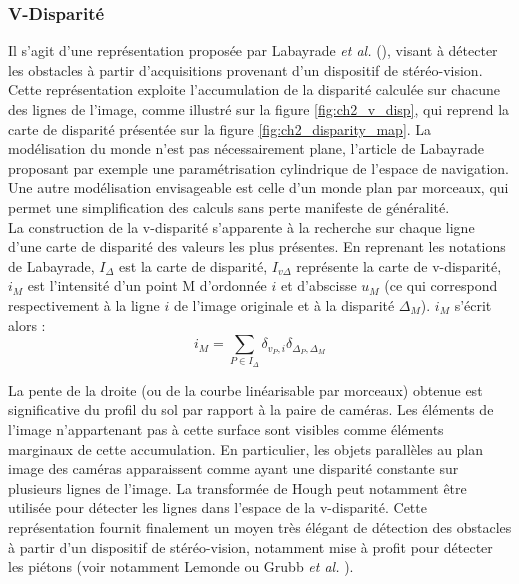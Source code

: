 \subsubsection{V-Disparité} %
Il s'agit d'une représentation proposée par Labayrade \textit{et al.} (\cite{Labayrade2002}), visant à détecter les obstacles à partir d'acquisitions provenant d'un dispositif de stéréo-vision. Cette représentation exploite l'accumulation de la disparité calculée sur chacune des lignes de l'image, comme illustré sur la figure \ref{fig:ch2_v_disp}, qui reprend la carte de disparité présentée sur la figure \ref{fig:ch2_disparity_map}. La modélisation du monde n'est pas nécessairement plane, l'article de Labayrade proposant par exemple une paramétrisation cylindrique de l'espace de navigation. Une autre modélisation envisageable est celle d'un monde plan par morceaux, qui permet une simplification des calculs sans perte manifeste de généralité.\\
La construction de la v-disparité s'apparente à la recherche sur chaque ligne d'une carte de disparité des valeurs les plus présentes. En reprenant les notations de Labayrade, $I_\Delta$ est la carte de disparité, $I_{v\Delta}$ représente la carte de v-disparité, $i_M$ est l'intensité d'un point M d'ordonnée $i$ et d'abscisse $u_M$ (ce qui correspond respectivement à la ligne $i$ de l'image originale et à la disparité $\Delta_M$). $i_M$ s'écrit alors :
\begin{equation}
	i_M = \sum\limits_{P \in I_\Delta} \delta_{v_P,i} \delta_{\Delta_P,\Delta_M}
	\label{eq:ch2_v_disparity}
\end{equation}

La pente de la droite (ou de la courbe linéarisable par morceaux) obtenue est significative du profil du sol par rapport à la paire de caméras. Les éléments de l'image n'appartenant pas à cette surface sont visibles comme éléments marginaux de cette accumulation. En particulier, les objets parallèles au plan image des caméras apparaissent comme ayant une disparité constante sur plusieurs lignes de l'image. La transformée de Hough peut notamment être utilisée pour détecter les lignes dans l'espace de la v-disparité. Cette représentation fournit finalement un moyen très élégant de détection des obstacles à partir d'un dispositif de stéréo-vision, notamment mise à profit pour détecter les piétons (voir notamment Lemonde ou Grubb \textit{et al.} \cite{Lemonde, Grubb2004}).

